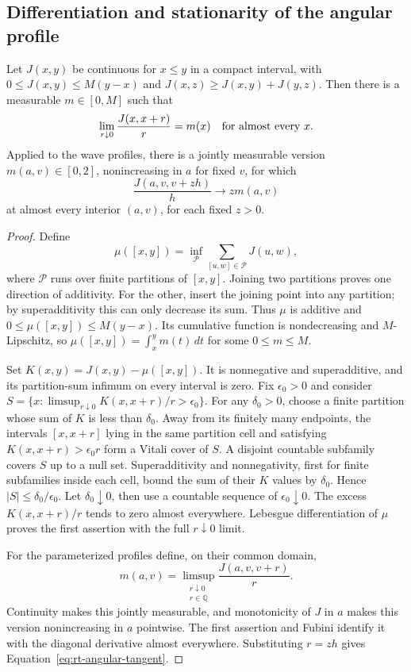 \subsection{Differentiation and stationarity of the angular profile}

\begin{lemma}
\label{lem:rt-interval-density}
Let $J(x,y)$ be continuous for $x\le y$ in a compact interval,
with $0\le J(x,y)\le M(y-x)$ and
$J(x,z)\ge J(x,y)+J(y,z)$.  Then there is a measurable
$m\in[0,M]$ such that
\[
 \lim_{r\downarrow0}\frac{J(x,x+r)}r=m(x)
 \quad\hbox{for almost every }x.
\]
Applied to the wave profiles, there is a jointly measurable version
$m(a,v)\in[0,2]$, nonincreasing in $a$ for fixed $v$, for which
\begin{equation}\label{eq:rt-angular-tangent}
 \frac{J(a,v,v+zh)}h\longrightarrow z m(a,v)
\end{equation}
at almost every interior $(a,v)$, for each fixed $z>0$.
\end{lemma}

\begin{proof}
Define
\[
 \mu([x,y])=\inf_{\mathcal P}
                  \sum_{[u,w]\in\mathcal P}J(u,w),
\]
where $\mathcal P$ runs over finite partitions of $[x,y]$.
Joining two partitions proves one direction of additivity.
For the other, insert the joining point into any partition; by
superadditivity this can only decrease its sum.  Thus $\mu$ is
additive and $0\le\mu([x,y])\le M(y-x)$.  Its cumulative
function is nondecreasing and $M$-Lipschitz, so
$\mu([x,y])=\int_x^ym(t)\,dt$ for some $0\le m\le M$.

Set $K(x,y)=J(x,y)-\mu([x,y])$.  It is nonnegative and
superadditive, and its partition-sum infimum on every interval is
zero.  Fix $\epsilon_0>0$ and consider
$S=\{x:\limsup_{r\downarrow0}K(x,x+r)/r>\epsilon_0\}$.
For any $\delta_0>0$, choose a finite partition whose sum of
$K$ is less than $\delta_0$.  Away from its finitely many
endpoints, the intervals $[x,x+r]$ lying in the same partition cell
and satisfying $K(x,x+r)>\epsilon_0r$ form a Vitali cover of
$S$.  A disjoint countable subfamily covers $S$ up to a null set.
Superadditivity and nonnegativity, first for finite subfamilies
inside each cell, bound the sum of their $K$ values by
$\delta_0$.  Hence $|S|\le\delta_0/\epsilon_0$.
Let $\delta_0\downarrow0$, then use a countable sequence of
$\epsilon_0\downarrow0$.  The excess $K(x,x+r)/r$ tends to
zero almost everywhere.  Lebesgue differentiation of $\mu$
proves the first assertion with the full $r\downarrow0$ limit.

For the parameterized profiles define, on their common domain,
\[
 m(a,v)=\limsup_{\substack{r\downarrow0\\r\in\mathbb Q}}
                         \frac{J(a,v,v+r)}r.
\]
Continuity makes this jointly measurable, and monotonicity of $J$
in $a$ makes this version nonincreasing in $a$ pointwise.
The first assertion and Fubini identify it with the diagonal
derivative almost everywhere.  Substituting $r=zh$ gives
Equation~\eqref{eq:rt-angular-tangent}.
\end{proof}

